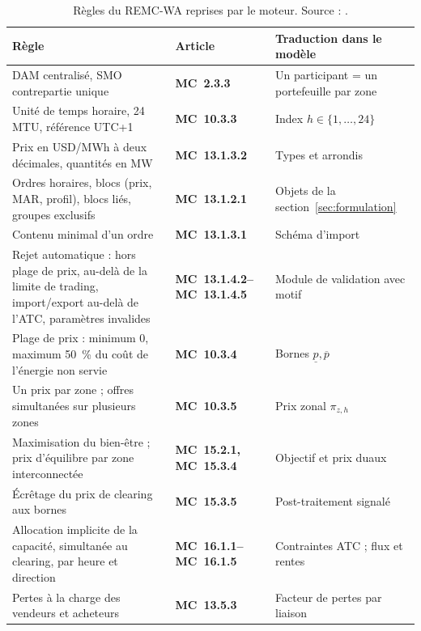 \documentclass[a4paper,12pt]{article}
\newcommand{\rowsep}{\addlinespace[2pt]\arrayrulecolor{black!35}\hline\arrayrulecolor{black}\addlinespace[3pt]}
\renewcommand{\arraystretch}{1.25}
\theoremstyle{definition}
\newcommand{\MC}[1]{MC~#1}
\begin{document}
\begin{table}[ht]
\centering\small
\setlength{\tabcolsep}{6pt}\renewcommand{\arraystretch}{1.35}\begin{tabular}{p{6.4cm}p{2.7cm}p{5.5cm}}
\toprule
Règle & Article & Traduction dans le modèle \\
\midrule
DAM centralisé, SMO contrepartie unique & \textbf{\MC{2.3.3}} & Un participant = un portefeuille par zone \\ \rowsep
Unité de temps horaire, 24 MTU, référence UTC+1 & \textbf{\MC{10.3.3}} & Index $h\in\{1,\dots,24\}$ \\ \rowsep
Prix en USD/MWh à deux décimales, quantités en MW & \textbf{\MC{13.1.3.2}} & Types et arrondis \\ \rowsep
Ordres horaires, blocs (prix, MAR, profil), blocs liés, groupes exclusifs & \textbf{\MC{13.1.2.1}} & Objets de la section~\ref{sec:formulation} \\ \rowsep
Contenu minimal d'un ordre & \textbf{\MC{13.1.3.1}} & Schéma d'import \\ \rowsep
Rejet automatique : hors plage de prix, au-delà de la limite de trading, import/export au-delà de l'ATC, paramètres invalides & \textbf{\MC{13.1.4.2}--\MC{13.1.4.5}} & Module de validation avec motif \\ \rowsep
Plage de prix : minimum 0, maximum 50~\% du coût de l'énergie non servie & \textbf{\MC{10.3.4}} & Bornes $\underline p,\overline p$ \\ \rowsep
Un prix par zone ; offres simultanées sur plusieurs zones & \textbf{\MC{10.3.5}} & Prix zonal $\pi_{z,h}$ \\ \rowsep
Maximisation du bien-être ; prix d'équilibre par zone interconnectée & \textbf{\MC{15.2.1}, \MC{15.3.4}} & Objectif et prix duaux \\ \rowsep
Écrêtage du prix de clearing aux bornes & \textbf{\MC{15.3.5}} & Post-traitement signalé \\ \rowsep
Allocation implicite de la capacité, simultanée au clearing, par heure et direction & \textbf{\MC{16.1.1}--\MC{16.1.5}} & Contraintes ATC ; flux et rentes \\ \rowsep
Pertes à la charge des vendeurs et acheteurs & \textbf{\MC{13.5.3}} & Facteur de pertes par liaison \\ 
\bottomrule
\end{tabular}
\caption{Règles du REMC-WA reprises par le moteur. Source : \citet{remcwa2025}.}
\label{tab:regles}
\end{table}
\end{document}
